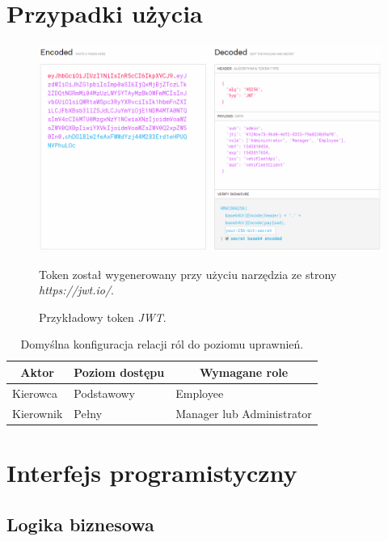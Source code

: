 \documentclass[eng,printmode,openany]{mgr}
\begin{document}
	\section{Przypadki użycia}
	
	
	
	\begin{figure}[h]
		\centering
		\includegraphics[scale=0.54]{images/jwt.png}
		\caption{Przykładowy token \textit{JWT}.}
		\small 
		Token został wygenerowany przy użyciu narzędzia ze strony \textit{https://jwt.io/}.
	\end{figure}
	
	\begin{table}[H]
		\caption{Domyślna konfiguracja relacji ról do poziomu uprawnień.}
		\begin{tabularx}{\textwidth}{|l|l|X|}
			\hline
			\multicolumn{1}{|c|}{\textbf{Aktor}} & \multicolumn{1}{c|}{\textbf{Poziom dostępu}} & \multicolumn{1}{c|}{\textbf{Wymagane role}} \\ \hline
			Kierowca                             & Podstawowy                                   & Employee                                    \\ \hline
			Kierownik                            & Pełny                                        & Manager lub Administrator                   \\ \hline
		\end{tabularx}
	\end{table}
	
	\newpage
	\section{Interfejs programistyczny}
	\subsection{Logika biznesowa}
	
\end{document}
